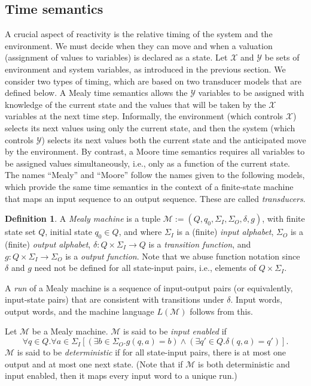 \documentclass{amsart}
\theoremstyle{plain}
\theoremstyle{definition}
\newtheorem{defn}{Definition}
\theoremstyle{definition}
\begin{document}
\subsection{Time semantics}

A crucial aspect of reactivity is the relative timing of the system and the
environment.  We must decide when they can move and when a valuation (assignment
of values to variables) is declared as a state.  Let $\mathcal{X}$ and
$\mathcal{Y}$ be sets of environment and system variables, as introduced in the
previous section.  We consider two types of timing, which are based on two
transducer models that are defined below.  A Mealy time semantics allows the
$\mathcal{Y}$ variables to be assigned with knowledge of the current state and
the values that will be taken by the $\mathcal{X}$ variables at the next time
step.  Informally, the environment (which controls $\mathcal{X}$) selects its
next values using only the current state, and then the system (which controls
$\mathcal{Y}$) selects its next values both the current state and the
anticipated move by the environment.  By contrast, a Moore time semantics
requires all variables to be assigned values simultaneously, i.e., only as a
function of the current state.  The names ``Mealy'' and ``Moore'' follow the
names given to the following models, which provide the same time semantics in
the context of a finite-state machine that maps an input sequence to an output
sequence.  These are called \textit{transducers}.
\begin{defn}
A \textit{Mealy machine} is a tuple $\mathcal{M}:=\left(Q,q_{0},\Sigma_{I},\Sigma_{O},\delta,g\right)$,
with finite state set $Q$, initial state $q_0 \in Q$, and
where $\Sigma_{I}$ is a (finite) \textit{input alphabet}, $\Sigma_{O}$
is a (finite) \textit{output alphabet}, $\delta:Q\times\Sigma_{I}\rightarrow Q$
is a \textit{transition function}, and $g:Q\times\Sigma_{I}\rightarrow\Sigma_{O}$
is a \textit{output function}. Note that we abuse function notation
since $\delta$ and $g$ need not be defined for all state-input pairs,
i.e., elements of $Q\times\Sigma_{I}$.

A \textit{run} of a Mealy machine is a sequence of input-output pairs (or
equivalently, input-state pairs) that are consistent with transitions under
$\delta$. Input words, output words, and the machine language
$L\left(\mathcal{M}\right)$ follows from this.

Let $\mathcal{M}$ be a Mealy machine. $\mathcal{M}$ is said to be
\textit{input enabled} if \[
\forall q\in Q.\forall a\in\Sigma_{I}\left[\left(\exists b\in\Sigma_{O}.g\left(q,a\right)=b\right)\wedge\left(\exists q'\in Q.\delta\left(q,a\right)=q'\right)\right].\]
 $\mathcal{M}$ is said to be \textit{deterministic} if for all state-input
pairs, there is at most one output and at most one next state. (Note
that if $\mathcal{M}$ is both deterministic and input enabled, then
it maps every input word to a unique run.)
\end{defn}
\end{document}
